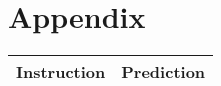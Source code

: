 \section{Appendix}
\label{sec:appendix}

\begin{table}[h]
\vspace{-.1in}
\centering
{}
\begin{tabular}{ll}
\toprule
\textbf{Instruction} & \textbf{Prediction} \\
    \midrule
\midrule







\end{tabular}
\end{table}
